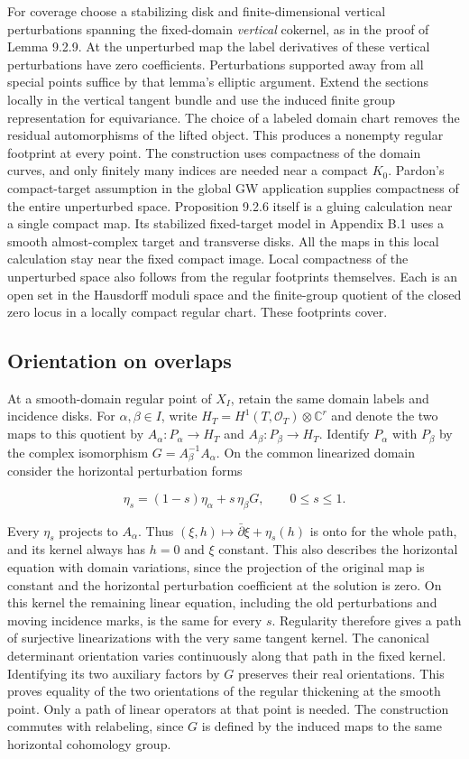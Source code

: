 For coverage choose a stabilizing disk and finite-dimensional
vertical perturbations spanning the fixed-domain \emph{vertical}
cokernel, as in the proof of Lemma 9.2.9. At the unperturbed map
the label derivatives of these vertical perturbations have zero
coefficients. Perturbations supported away from all special points
suffice by that lemma's elliptic argument. Extend the sections
locally in the vertical tangent bundle and use the induced finite
group representation for equivariance. The choice of a labeled
domain chart removes the residual automorphisms of the lifted object.
This produces a nonempty regular footprint at every point. The construction
uses compactness of the domain curves, and only finitely many indices
are needed near a compact $K_0$. Pardon's compact-target assumption
in the global GW application supplies compactness of the entire
unperturbed space. Proposition 9.2.6 itself is a gluing calculation
near a single compact map. Its stabilized fixed-target model in
Appendix B.1 uses a smooth almost-complex target and transverse
disks. All the maps in this local calculation stay near the fixed compact image. Local compactness of the unperturbed
space also follows from the regular footprints themselves. Each is
an open set in the Hausdorff moduli space and the finite-group
quotient of the closed zero locus in a locally compact regular
chart. These footprints cover.

\subsection{Orientation on overlaps} At a smooth-domain regular
point of $X_I$, retain the same domain labels and incidence disks.
For $\alpha,\beta\in I$, write $H_T=H^1(T,\mathcal O_T)\otimes
\mathbb C^r$ and denote the two maps to this quotient by
$A_\alpha:P_\alpha\to H_T$ and $A_\beta:P_\beta\to H_T$.
Identify $P_\alpha$ with $P_\beta$ by the complex isomorphism
$G=A_\beta^{-1}A_\alpha$. On the common linearized domain consider
the horizontal perturbation forms

\[
            \eta_s=(1-s)\eta_\alpha+s\,\eta_\beta G,
            \qquad 0\leq s\leq1 .
\]

Every $\eta_s$ projects to $A_\alpha$. Thus
$(\xi,h)\mapsto\bar\partial\xi+\eta_s(h)$ is onto for the whole
path, and its kernel always has $h=0$ and $\xi$ constant. This
also describes the horizontal equation with domain variations,
since the projection of the original map is constant and the
horizontal perturbation coefficient at the solution is zero.
On this kernel the remaining linear equation, including the old
perturbations and moving incidence marks, is the same for every
$s$. Regularity therefore gives a path of surjective linearizations
with the very same tangent kernel. The canonical determinant
orientation varies continuously along that path in the fixed
kernel. Identifying its two auxiliary factors by $G$ preserves
their real orientations. This proves equality of the two
orientations of the regular thickening at the smooth point.
Only a path of linear operators at that point is needed. The
construction commutes with relabeling, since $G$ is defined by
the induced maps to the same horizontal cohomology group.

